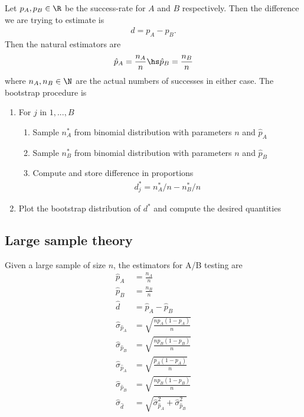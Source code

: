 \documentclass{article}
\begin{document}
Let $p_A,p_B\in\R$ be the success-rate for $A$ and $B$ respectively. Then the
difference we are trying to estimate is
\begin{align*}
	d = p_A - p_B.
\end{align*}
Then the natural estimators are
\begin{align*}
	\hat p_A = \frac{n_A}{n}\hs \hat p_B = \frac{n_B}{n}
\end{align*}
where $n_A,n_B\in\N$ are the actual numbers of successes in either case.
The bootstrap procedure is
\begin{enumerate}
	\item For $j$ in $1,...,B$ \begin{enumerate}
		\item Sample $n^*_A$ from binomial distribution with parameters $n$ and $\hat p_A$
		\item Sample $n^*_B$ from binomial distribution with parameters $n$ and $\hat p_B$
		\item Compute and store difference in proportions \begin{align*}
			d^*_j = n^*_A/n - n^*_B/n
		\end{align*}
	\end{enumerate}
	\item Plot the bootstrap distribution of $d^*$ and compute the desired quantities
\end{enumerate}

\subsection{Large sample theory}

\begin{theorem}
	Given a large sample of size $n$, the estimators for A/B testing are
	\begin{align*}
		\hat p_A &= \frac{n_A}{n}\\
		\hat p_B &=\frac{n_B}{n}\\
		\hat d   &= \hat p_A - \hat p_B\\
		\hat\sigma_{\hat p_A} &= \sqrt{\frac{np_A(1-p_A)}{n}}\\
		\hat\sigma_{\hat p_B} &= \sqrt{\frac{np_B(1-p_B)}{n}}\\
		\hat\sigma_{\hat p_A} &= \sqrt{\frac{p_A(1-p_A)}{n}}\\
		\hat\sigma_{\hat p_B} &= \sqrt{\frac{np_B(1-p_B)}{n}}\\
		\hat\sigma_{\hat d}   &= \sqrt{\hat\sigma^2_{\hat p_A} + \hat\sigma^2_{\hat p_B}}
	\end{align*}
\end{theorem}
\end{document}
